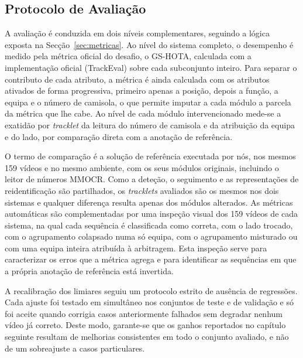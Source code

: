 \subsection{Protocolo de Avaliação}\label{sec:protocolo}

A avaliação é conduzida em dois níveis complementares, seguindo a lógica exposta na
Secção~\ref{sec:metricas}. Ao nível do sistema completo, o desempenho é medido pela métrica oficial
do desafio, o GS-HOTA, calculada com a implementação oficial (TrackEval) sobre cada subconjunto
inteiro. Para separar o contributo de cada atributo, a métrica é ainda calculada com os atributos
ativados de forma progressiva, primeiro apenas a posição, depois a função, a equipa e o número de
camisola, o que permite imputar a cada módulo a parcela da métrica que lhe cabe. Ao nível de cada
módulo intervencionado mede-se a exatidão por \emph{tracklet} da leitura do número de camisola e da
atribuição da equipa e do lado, por comparação direta com a anotação de referência.

O termo de comparação é a solução de referência executada por nós, nos mesmos 159 vídeos e no mesmo
ambiente, com os seus módulos originais, incluindo o leitor de números MMOCR. Como a deteção, o
seguimento e as representações de reidentificação são partilhados, os \emph{tracklets} avaliados são
os mesmos nos dois sistemas e qualquer diferença resulta apenas dos módulos alterados. As métricas
automáticas são complementadas por uma inspeção visual dos 159 vídeos de cada sistema, na qual cada
sequência é classificada como correta, com o lado trocado, com o agrupamento colapsado numa
só equipa, com o agrupamento misturado ou com uma equipa inteira atribuída à arbitragem. Esta
inspeção serve para caracterizar os erros que a métrica agrega e para identificar as sequências em
que a própria anotação de referência está invertida.

A recalibração dos limiares seguiu um protocolo estrito de ausência de regressões. Cada ajuste foi
testado em simultâneo nos conjuntos de teste e de validação e só foi aceite quando corrigia casos
anteriormente falhados sem degradar nenhum vídeo já correto. Deste modo, garante-se que os ganhos
reportados no capítulo seguinte resultam de melhorias consistentes em todo o conjunto avaliado, e não
de um sobreajuste a casos particulares.
